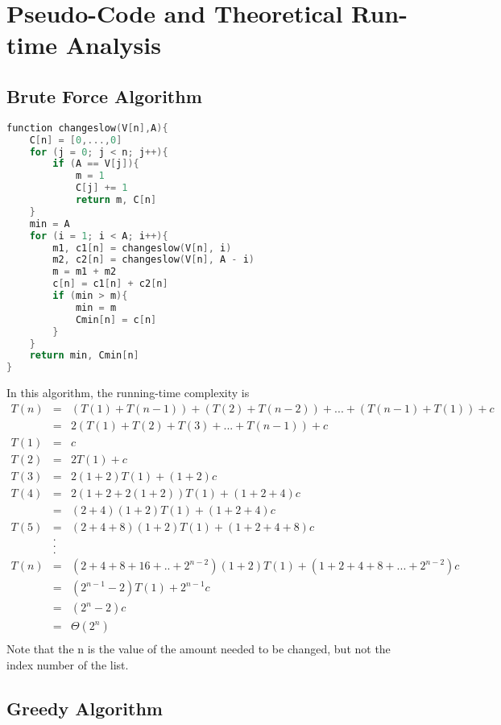 \documentclass[11pt]{scrreprt}
\begin{document}
\chapter{Pseudo-Code and Theoretical Run-time Analysis}

\section {Brute Force Algorithm}

\begin{lstlisting}[language=c]
function changeslow(V[n],A){
	C[n] = [0,...,0]
	for (j = 0; j < n; j++){
		if (A == V[j]){
			m = 1
			C[j] += 1
			return m, C[n]
	}
	min = A
	for (i = 1; i < A; i++){
		m1, c1[n] = changeslow(V[n], i)
		m2, c2[n] = changeslow(V[n], A - i)
		m = m1 + m2
		c[n] = c1[n] + c2[n]
		if (min > m){
			min = m
			Cmin[n] = c[n]
		}
	}
	return min, Cmin[n]
}
\end{lstlisting}
In this algorithm, the running-time complexity is
\begin{eqnarray*}
T(n) 	& = & (T(1)+ T(n-1)) + (T(2) + T(n-2)) + ... + (T(n-1) + T(1)) + c\\
		& = & 2(T(1) + T(2) + T(3) + ... + T(n-1)) + c\\
T(1)	& = & c\\
T(2) 	& = & 2T(1) + c\\
T(3) 	& = & 2(1+2)T(1) + (1+2)c\\
T(4) 	& = & 2(1+2+2(1+2))T(1) + (1+2+4)c\\
	 	& = & (2+4)(1+2)T(1) + (1+2+4)c\\
T(5) 	& = & (2+4+8)(1+2)T(1) + (1+2+4+8)c\\
		& . & \\
		& . & \\
		& . & \\
T(n) 	& = & (2+4+8+16+..+2^{n-2})(1+2)T(1) + (1+2+4+8+...+2^{n-2})c\\
		& = & (2^{n-1}-2)T(1) + 2^{n-1}c\\
		& = & (2^n-2)c\\
		& = & \Theta(2^n)\\
\end{eqnarray*}
Note that the n is the value of the amount needed to be changed, but not the index number of the list.



\section{Greedy Algorithm}
\end{document}
